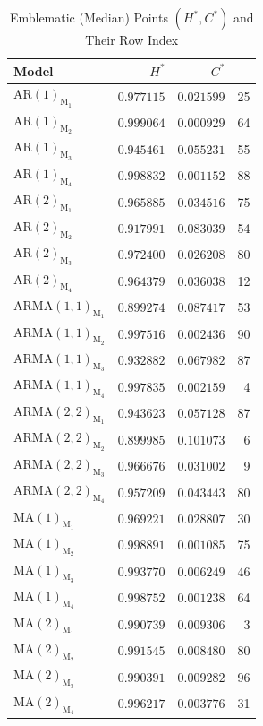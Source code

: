 \documentclass[12pt,a4paper]{article}
\begin{document}
	\begin{table}[H]
		\centering
		\caption{Emblematic (Median) Points $(H^*, C^*)$ and Their Row Index}
		\begin{tabular}{lrrr}
			\toprule
			Model & $H^*$ & $C^*$ & \text{Emblematic row} \\
			\midrule
			$\mathrm{AR}(1)_{\textrm{M}_1}$ & $0.977115$ & $0.021599$ & 25 \\
			$\mathrm{AR}(1)_{\textrm{M}_2}$ & $0.999064$ & $0.000929$ & 64 \\
			$\mathrm{AR}(1)_{\textrm{M}_3}$ & $0.945461$ & $0.055231$ & 55 \\
			$\mathrm{AR}(1)_{\textrm{M}_4}$ & $0.998832$ & $0.001152$ & 88 \\
			$\mathrm{AR}(2)_{\textrm{M}_1}$ & $0.965885$ & $0.034516$ & 75 \\
			$\mathrm{AR}(2)_{\textrm{M}_2}$ & $0.917991$ & $0.083039$ & 54 \\
			$\mathrm{AR}(2)_{\textrm{M}_3}$ & $0.972400$ & $0.026208$ & 80 \\
			$\mathrm{AR}(2)_{\textrm{M}_4}$ & $0.964379$ & $0.036038$ & 12 \\
			$\mathrm{ARMA}(1,1)_{\textrm{M}_1}$ & $0.899274$ & $0.087417$ & 53 \\
			$\mathrm{ARMA}(1,1)_{\textrm{M}_2}$ & $0.997516$ & $0.002436$ & 90 \\
			$\mathrm{ARMA}(1,1)_{\textrm{M}_3}$ & $0.932882$ & $0.067982$ & 87 \\
			$\mathrm{ARMA}(1,1)_{\textrm{M}_4}$ & $0.997835$ & $0.002159$ & 4 \\
			$\mathrm{ARMA}(2,2)_{\textrm{M}_1}$ & $0.943623$ & $0.057128$ & 87 \\
			$\mathrm{ARMA}(2,2)_{\textrm{M}_2}$ & $0.899985$ & $0.101073$ & 6 \\
			$\mathrm{ARMA}(2,2)_{\textrm{M}_3}$ & $0.966676$ & $0.031002$ & 9 \\
			$\mathrm{ARMA}(2,2)_{\textrm{M}_4}$ & $0.957209$ & $0.043443$ & 80 \\
			$\mathrm{MA}(1)_{\textrm{M}_1}$ & $0.969221$ & $0.028807$ & 30 \\
			$\mathrm{MA}(1)_{\textrm{M}_2}$ & $0.998891$ & $0.001085$ & 75 \\
			$\mathrm{MA}(1)_{\textrm{M}_3}$ & $0.993770$ & $0.006249$ & 46 \\
			$\mathrm{MA}(1)_{\textrm{M}_4}$ & $0.998752$ & $0.001238$ & 64 \\
			$\mathrm{MA}(2)_{\textrm{M}_1}$ & $0.990739$ & $0.009306$ & 3 \\
			$\mathrm{MA}(2)_{\textrm{M}_2}$ & $0.991545$ & $0.008480$ & 80 \\
			$\mathrm{MA}(2)_{\textrm{M}_3}$ & $0.990391$ & $0.009282$ & 96 \\
			$\mathrm{MA}(2)_{\textrm{M}_4}$ & $0.996217$ & $0.003776$ & 31 \\
			\bottomrule
		\end{tabular}
		\label{tab:medianPoints}
	\end{table}
	
\end{document}
